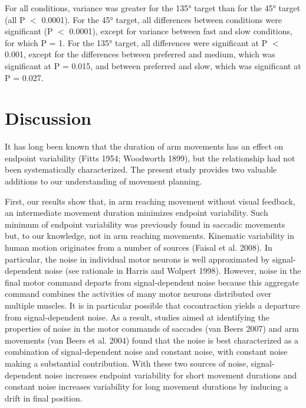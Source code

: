 For all conditions, variance was greater for the \ang{135} target
than for the \ang{45} target (all P $<$ 0.0001). For the \ang{45} target, all differences between conditions were significant (P $<$ 0.0001), except for variance between fast and slow conditions, for which P = 1. For the \ang{135} target, all differences were significant at P $<$ 0.001, except for the differences between preferred and medium, which was significant at P = 0.015, and between preferred and slow, which was significant at P = 0.027.

\section{Discussion}

It has long been known that the duration of arm movements has an effect on endpoint variability \cite{Fitts1954, Woodworth1899}(Fitts 1954; Woodworth 1899), but the relationship had not been systematically characterized. The present study provides two valuable additions to our understanding of movement planning.

First, our results show that, in arm reaching movement without visual feedback, an intermediate movement duration minimizes endpoint variability. Such minimum of endpoint variability was previously found in saccadic movements \cite{VanBeers2008} but, to our knowledge, not in arm reaching movements. Kinematic variability in human motion originates from a number of sources \cite{Faisal2008} (Faisal et al. 2008). In particular, the noise in individual motor neurons is well approximated by signal-dependent noise (see rationale in \cite{Harris1998}Harris and Wolpert 1998). However, noise in the final motor command departs from signal-dependent noise because this aggregate command combines the activities of many motor neurons distributed over multiple muscles. It is in particular possible that cocontraction yields a departure from signal-dependent noise. As a result, studies aimed at identifying the properties of noise in the motor commands of saccades \cite{VanBeers2007}(van Beers 2007) and arm movements \cite{VanBeers2004}(van Beers et al. 2004) found that the noise is best characterized as a combination of signal-dependent noise and constant noise, with constant noise making a substantial contribution. With these two sources of noise, signal-dependent noise increases endpoint variability for short movement durations and constant noise increases variability for long movement durations by inducing a drift in final position.

